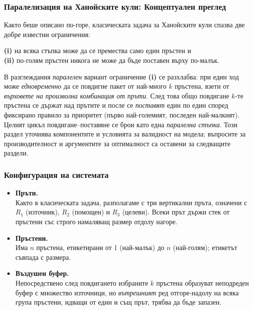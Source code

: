 \subsubsection{{Паралелизация на Ханойските кули: Концептуален преглед}\label{sec:parallel-concept}}

\hspace*{2.5em}Както беше описано по-горе, класическата задача за Ханойските кули спазва две добре известни ограничения: \vspace*{0.05cm}

\noindent
\hspace*{2em}\textbf{(i)} на всяка стъпка може да се премества само един пръстен и\\
\hspace*{2em}\textbf{(ii)} по-голям пръстен никога не може да бъде поставен върху по-малък.

\vspace*{0.20cm}

В разглеждания \emph{паралелен} вариант ограничение \textbf{(i)} се разхлабва: при един ход може \emph{едновременно} да се повдигне пакет от най-много $k$ пръстена, взети от \emph{върховете на произволна комбинация от пръти}. След това общо повдигане $k$-те пръстена се държат над прътите и после се \emph{поставят} един по един според фиксирано правило за приоритет (първо най-големият, последен най-малкият). Целият цикъл повдигане–поставяне се брои като една \emph{паралелна стъпка}. 
Този раздел уточнява компонентите и условията за валидност на модела; въпросите за производителност и аргументите за оптималност са оставени за следващите раздели.


\subsubsection{Конфигурация на системата}

\begin{itemize}
	\item \textbf{Пръти.}\\Както в класическата задача, разполагаме с три вертикални пръта, означени с \(R_1\) (източник), \(R_2\) (помощен) и \(R_3\) (целеви). Всеки прът държи стек от пръстени със строго намаляващ размер отдолу нагоре.
	
	\item \textbf{Пръстени.}\\Има \(n\) пръстена, етикетирани от 1 (най-малък) до \(n\) (най-голям); етикетът съвпада с размера.
	
	\item \textbf{Въздушен буфер.}\\Непосредствено след повдигането избраните \(k\) пръстена образуват неподреден буфер с множество източници, но \emph{вътрешният} ред отгоре-надолу на всяка група пръстени, идващи от един и същ прът, трябва да бъде запазен.
\end{itemize}

